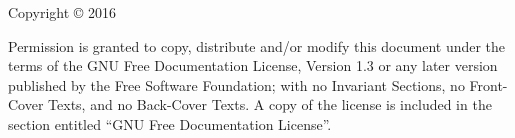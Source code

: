 
\begin{titlepage}

\begin{center}

\huge \doctitle

\bigskip

\normalsize \docauthor

\end{center}

\end{titlepage}

\thispagestyle{empty}

\noindent Copyright \copyright{} 2016\ \ \docauthor

\bigskip

\noindent Permission is granted to copy, distribute and/or modify this
document under the terms of the GNU Free Documentation License, Version
1.3 or any later version published by the Free Software Foundation; with
no Invariant Sections, no Front-Cover Texts, and no Back-Cover Texts.  A
copy of the license is included in the section entitled ``GNU Free
Documentation License''.

